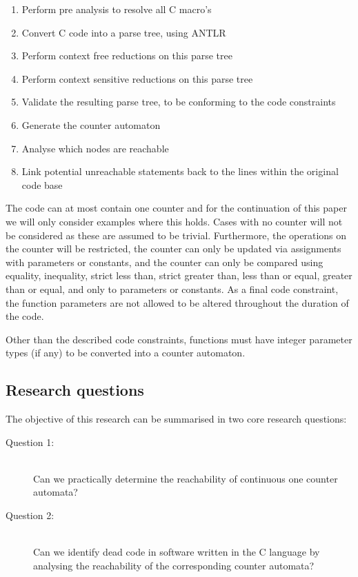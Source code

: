 \documentclass[12pt]{article}
\begin{document}
\begin{enumerate}
	\item Perform pre analysis to resolve all C macro's
	\item Convert C code into a parse tree, using ANTLR
	\item Perform context free reductions on this parse tree
	\item Perform context sensitive reductions on this parse tree
	\item Validate the resulting parse tree, to be conforming to the code constraints
	\item Generate the counter automaton
	\item Analyse which nodes are reachable
	\item Link potential unreachable statements back to the lines within the original code base
\end{enumerate}

The code can at most contain one counter and for the continuation of this paper we will only consider examples where this holds. Cases with no counter will not be considered as these are assumed to be trivial. Furthermore, the operations on the counter will be restricted, the counter can only be updated via assignments with parameters or constants, and the counter can only be compared using equality, inequality, strict less than, strict greater than, less than or equal, greater than or equal, and only to parameters or constants. As a final code constraint, the function parameters are not allowed to be altered throughout the duration of the code.

Other than the described code constraints, functions must have integer parameter types (if any) to be converted into a counter automaton.

\subsection{Research questions}
The objective of this research can be summarised in two core research questions:

\begin{description}
	\item[Question 1: ] \hfill \\ Can we practically determine the reachability of continuous one counter automata?
	\item[Question 2: ] \hfill \\ Can we identify dead code in software written in the C language by analysing the reachability of the corresponding counter automata?
\end{description}
\end{document}
